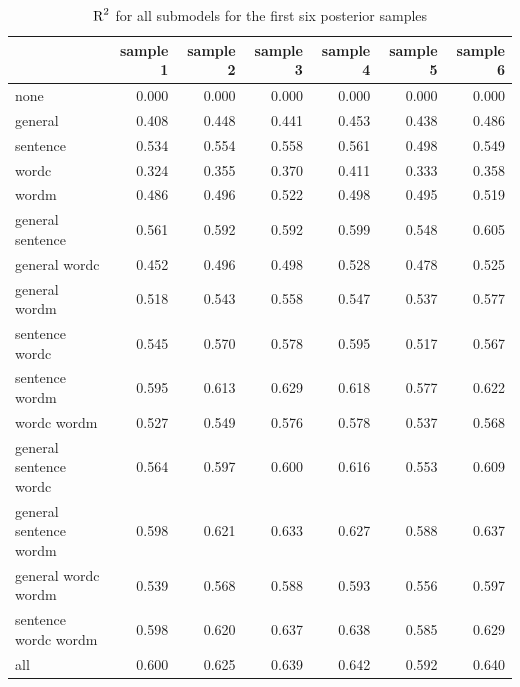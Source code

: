 \documentclass[11pt,a4paper,twoside]{book}
\newenvironment{knitrout}{}{} %
\begin{document}
\begin{knitrout}
\color{fgcolor}\begin{table}

\caption{\label{tab:empirical.data.postsample3}$ \text{R}^2$ for all submodels for the first six posterior samples}
\centering
\begin{tabular}[t]{lrrrrrr}
\toprule
  & sample 1 & sample 2 & sample 3 & sample 4 & sample 5 & sample 6\\
\midrule
none & 0.000 & 0.000 & 0.000 & 0.000 & 0.000 & 0.000\\
general & 0.408 & 0.448 & 0.441 & 0.453 & 0.438 & 0.486\\
sentence & 0.534 & 0.554 & 0.558 & 0.561 & 0.498 & 0.549\\
wordc & 0.324 & 0.355 & 0.370 & 0.411 & 0.333 & 0.358\\
wordm & 0.486 & 0.496 & 0.522 & 0.498 & 0.495 & 0.519\\
general sentence & 0.561 & 0.592 & 0.592 & 0.599 & 0.548 & 0.605\\
general wordc & 0.452 & 0.496 & 0.498 & 0.528 & 0.478 & 0.525\\
general wordm & 0.518 & 0.543 & 0.558 & 0.547 & 0.537 & 0.577\\
sentence wordc & 0.545 & 0.570 & 0.578 & 0.595 & 0.517 & 0.567\\
sentence wordm & 0.595 & 0.613 & 0.629 & 0.618 & 0.577 & 0.622\\
wordc wordm & 0.527 & 0.549 & 0.576 & 0.578 & 0.537 & 0.568\\
general sentence wordc & 0.564 & 0.597 & 0.600 & 0.616 & 0.553 & 0.609\\
general sentence wordm & 0.598 & 0.621 & 0.633 & 0.627 & 0.588 & 0.637\\
general wordc wordm & 0.539 & 0.568 & 0.588 & 0.593 & 0.556 & 0.597\\
sentence wordc wordm & 0.598 & 0.620 & 0.637 & 0.638 & 0.585 & 0.629\\
all & 0.600 & 0.625 & 0.639 & 0.642 & 0.592 & 0.640\\
\bottomrule
\end{tabular}
\end{table}


\end{knitrout}
\end{document}
